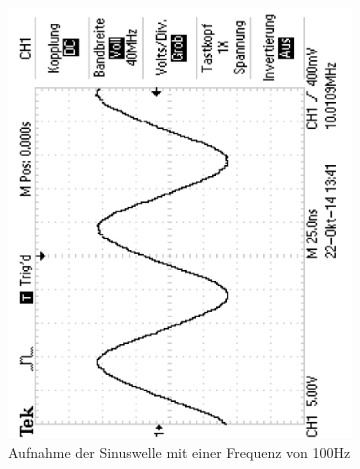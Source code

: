 \documentclass[12pt,a4paper]{article}
\begin{document}
\begin{figure}[H]
        \centering
        \begin{subfigure}[b]{0.48\textwidth}
                \includegraphics[width=\textwidth , scale = 0.4, angle = -90]{2_1_sin_10mhz.pdf}
                \caption[Aufnahme der Sinuswelle mit einer Frequenz von 100Hz]{Aufnahme der Sinuswelle mit einer Frequenz von 100Hz}
 				 \label{fig:2_1_sin_100hz}
        \end{subfigure}%
        ~ %
        \hfill
        \begin{subfigure}[b]{0.48\textwidth}

\end{subfigure}
\end{figure}
\end{document}
